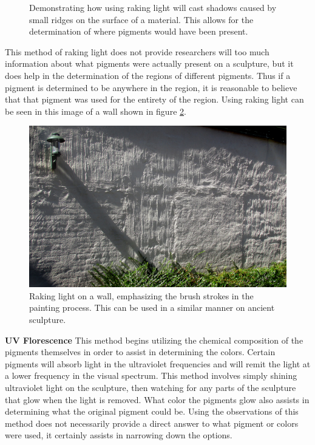 \documentclass[10pt]{armath}
\begin{document}
\begin{figure}[htpb]
  \begin{center}
  \end{center}
  \caption{Demonstrating how using raking light will cast shadows caused by
  small ridges on the surface of a material. This allows for the determination
  of where pigments would have been present.}
  \label{fig:raking_light_2}
\end{figure}

This method of raking light does not provide researchers will too much
information about what pigments were actually present on a sculpture, but it
does help in the determination of the regions of different pigments. Thus if a
pigment is determined to be anywhere in the region, it is reasonable to believe
that that pigment was used for the entirety of the region. Using raking light
can be seen in this image of a wall shown in figure
\ref{fig:raking_light_3}\autocite{RLI}.

\begin{figure}[htpb]
  \centering
  \includegraphics[width=0.5\linewidth]{raking_light.jpg}
  \caption{Raking light on a wall, emphasizing the brush strokes in the
  painting process. This can be used in a similar manner on ancient sculpture.}
  \label{fig:raking_light_3}
\end{figure}

\textbf{UV Florescence} This method begins utilizing the chemical composition
of the pigments themselves in order to assist in determining the colors.
Certain pigments will absorb light in the ultraviolet frequencies and will
remit the light at a lower frequency in the visual spectrum. This method
involves simply shining ultraviolet light on the sculpture, then watching for
any parts of the sculpture that glow when the light is removed. What color the
pigments glow also assists in determining what the original pigment could be.
Using the observations of this method does not necessarily provide a direct
answer to what pigment or colors were used, it certainly assists in narrowing
down the options.
\end{document}
